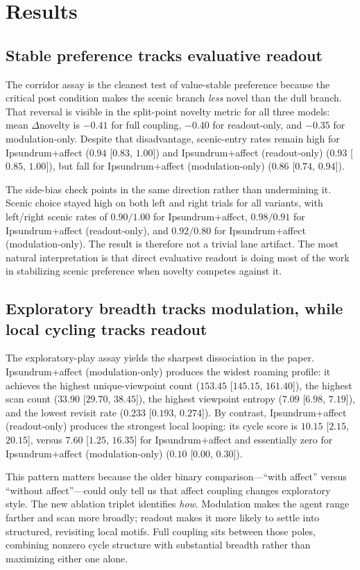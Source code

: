 \documentclass[letterpaper]{article}
\newcommand{\full}{Ipsundrum+affect}
\newcommand{\readout}{Ipsundrum+affect (readout-only)}
\newcommand{\modulation}{Ipsundrum+affect (modulation-only)}
\begin{document}
\section{Results}
\subsection{Stable preference tracks evaluative readout}
The corridor assay is the cleanest test of value-stable preference because the critical post condition makes the scenic branch \emph{less} novel than the dull branch. That reversal is visible in the split-point novelty metric for all three models: mean $\Delta$novelty is $-0.41$ for full coupling, $-0.40$ for readout-only, and $-0.35$ for modulation-only. Despite that disadvantage, scenic-entry rates remain high for \full{} ($0.94$ [$0.83$, $1.00$]) and \readout{} ($0.93$ [$0.85$, $1.00$]), but fall for \modulation{} ($0.86$ [$0.74$, $0.94$]).

The side-bias check points in the same direction rather than undermining it. Scenic choice stayed high on both left and right trials for all variants, with left/right scenic rates of $0.90/1.00$ for \full{}, $0.98/0.91$ for \readout{}, and $0.92/0.80$ for \modulation. The result is therefore not a trivial lane artifact. The most natural interpretation is that direct evaluative readout is doing most of the work in stabilizing scenic preference when novelty competes against it.

\subsection{Exploratory breadth tracks modulation, while local cycling tracks readout}
The exploratory-play assay yields the sharpest dissociation in the paper. \modulation{} produces the widest roaming profile: it achieves the highest unique-viewpoint count ($153.45$ [$145.15$, $161.40$]), the highest scan count ($33.90$ [$29.70$, $38.45$]), the highest viewpoint entropy ($7.09$ [$6.98$, $7.19$]), and the lowest revisit rate ($0.233$ [$0.193$, $0.274$]). By contrast, \readout{} produces the strongest local looping: its cycle score is $10.15$ [$2.15$, $20.15$], versus $7.60$ [$1.25$, $16.35$] for \full{} and essentially zero for \modulation{} ($0.10$ [$0.00$, $0.30$]).

This pattern matters because the older binary comparison---``with affect'' versus ``without affect''---could only tell us that affect coupling changes exploratory style. The new ablation triplet identifies \emph{how}. Modulation makes the agent range farther and scan more broadly; readout makes it more likely to settle into structured, revisiting local motifs. Full coupling sits between those poles, combining nonzero cycle structure with substantial breadth rather than maximizing either one alone.
\end{document}

